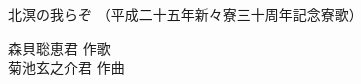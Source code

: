 \documentclass[10pt,b5j]{tarticle} %
\begin{document}
\begin{minipage}[c]{0.7\hsize} %
    \begin{center}
        {\LARGE
            北溟の我らぞ %
        }
        {\small 
            （平成二十五年新々寮三十周年記念寮歌） %
        }
    \end{center}
\end{minipage}
\begin{minipage}[c]{0.3\hsize} %
    \begin{flushright} %
        森貝聡恵君 作歌\\菊池玄之介君 作曲 %
    \end{flushright}
\end{minipage}
\end{document}
